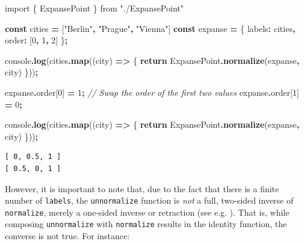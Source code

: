 \documentclass[
  openany]{book}
\newenvironment{Shaded}{\begin{snugshade}}{\end{snugshade}}
\newcommand{\AttributeTok}[1]{\textcolor[rgb]{0.13,0.29,0.53}{#1}}
\newcommand{\BuiltInTok}[1]{#1}
\newcommand{\CommentTok}[1]{\textcolor[rgb]{0.56,0.35,0.01}{\textit{#1}}}
\newcommand{\ControlFlowTok}[1]{\textcolor[rgb]{0.13,0.29,0.53}{\textbf{#1}}}
\newcommand{\DecValTok}[1]{\textcolor[rgb]{0.00,0.00,0.81}{#1}}
\newcommand{\FunctionTok}[1]{\textcolor[rgb]{0.13,0.29,0.53}{\textbf{#1}}}
\newcommand{\ImportTok}[1]{#1}
\newcommand{\KeywordTok}[1]{\textcolor[rgb]{0.13,0.29,0.53}{\textbf{#1}}}
\newcommand{\NormalTok}[1]{#1}
\newcommand{\OperatorTok}[1]{\textcolor[rgb]{0.81,0.36,0.00}{\textbf{#1}}}
\newcommand{\StringTok}[1]{\textcolor[rgb]{0.31,0.60,0.02}{#1}}
\theoremstyle{definition}
\theoremstyle{definition}
\theoremstyle{definition}
\theoremstyle{definition}
\theoremstyle{remark}
\begin{document}
\begin{Shaded}
\begin{Highlighting}[]
\ImportTok{import}\NormalTok{ \{ ExpansePoint \} }\ImportTok{from} \StringTok{"./ExpansePoint"}

\KeywordTok{const}\NormalTok{ cities }\OperatorTok{=}\NormalTok{ [}\StringTok{"Berlin"}\OperatorTok{,} \StringTok{"Prague"}\OperatorTok{,} \StringTok{"Vienna"}\NormalTok{]}
\KeywordTok{const}\NormalTok{ expanse }\OperatorTok{=}\NormalTok{ \{ labels}\OperatorTok{:}\NormalTok{ cities}\OperatorTok{,}\NormalTok{ order}\OperatorTok{:}\NormalTok{ [}\DecValTok{0}\OperatorTok{,} \DecValTok{1}\OperatorTok{,} \DecValTok{2}\NormalTok{] \}}\OperatorTok{;}

\BuiltInTok{console}\OperatorTok{.}\FunctionTok{log}\NormalTok{(cities}\OperatorTok{.}\FunctionTok{map}\NormalTok{((city) }\KeywordTok{=\textgreater{}}\NormalTok{ \{}
  \ControlFlowTok{return}\NormalTok{ ExpansePoint}\OperatorTok{.}\FunctionTok{normalize}\NormalTok{(expanse}\OperatorTok{,}\NormalTok{ city)}
\NormalTok{\}))}\OperatorTok{;}

\NormalTok{expanse}\OperatorTok{.}\AttributeTok{order}\NormalTok{[}\DecValTok{0}\NormalTok{] }\OperatorTok{=} \DecValTok{1}\OperatorTok{;} \CommentTok{// Swap the order of the first two values}
\NormalTok{expanse}\OperatorTok{.}\AttributeTok{order}\NormalTok{[}\DecValTok{1}\NormalTok{] }\OperatorTok{=} \DecValTok{0}\OperatorTok{;}

\BuiltInTok{console}\OperatorTok{.}\FunctionTok{log}\NormalTok{(cities}\OperatorTok{.}\FunctionTok{map}\NormalTok{((city) }\KeywordTok{=\textgreater{}}\NormalTok{ \{}
  \ControlFlowTok{return}\NormalTok{ ExpansePoint}\OperatorTok{.}\FunctionTok{normalize}\NormalTok{(expanse}\OperatorTok{,}\NormalTok{ city)}
\NormalTok{\}))}\OperatorTok{;}
\end{Highlighting}
\end{Shaded}

\begin{verbatim}
[ 0, 0.5, 1 ]
[ 0.5, 0, 1 ]
\end{verbatim}

However, it is important to note that, due to the fact that there is a finite number of \texttt{labels}, the \texttt{unnormalize} function is \emph{not} a full, two-sided inverse of \texttt{normalize}, merely a one-sided inverse or retraction (see e.g. ). That is, while composing \texttt{unnormalize} with \texttt{normalize} results in the identity function, the converse is not true. For instance:
\end{document}
